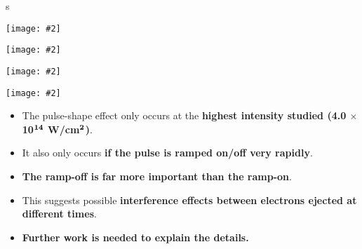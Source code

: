 \documentclass[landscape,a0b,final]{a0poster}
\newenvironment{poster}{
  \begin{center}
  \begin{minipage}[c]{0.98\textwidth}
}{
  \end{minipage} 
  \end{center}
}
\newcommand{\pbox}[4]{
\psshadowbox[#3]{
\begin{minipage}[t][#2][t]{#1}
#4
\end{minipage}
}}
\newcommand{\myfig}[3][0]{
\begin{center}
  \vspace{1.5cm}
  \texttt{[image: \#2]}
  \nobreak\medskip
\end{center}}
\newcommand{\mycaption}[1]{
  \vspace{0.5cm}
  \begin{quote}
    {{\sc Fig.} \arabic{figure}: #1}
  \end{quote}
  \vspace{1cm}
  \stepcounter{figure}
}
\begin{document}
\begin{poster}
\begin{multicols}{3}
  \vspace{-2.0cm}
  \setlength{\columnsep}{0pt}
  \setlength{\columnseprule}{0pt}
  \hspace{-2cm}s
  \begin{multicols}{2}
  \begin{center}
  \myfig{c_pulse_350_10_20_10.ps}{.90}
  \end{center}

  \begin{center}
  \myfig{c_fourier_350_10_20_10.ps}{.90}
  \end{center}
  \end{multicols}

  \vspace{-2.0cm}
  \setlength{\columnsep}{0pt}
  \setlength{\columnseprule}{0pt}
  \hspace{-2cm}
  \begin{multicols}{2}
  \begin{center}
  \myfig{c_pulse_350_20_0_20.ps}{.90}
  \end{center}

  \begin{center}
  \myfig{c_fourier_350_20_0_20.ps}{.90}
  \end{center}
  \end{multicols}


  \begin{center}\pbox{0.8\columnwidth}{}{linewidth=2mm,framearc=0.1,linecolor=lightblue,fillstyle=gradient,
             gradangle=0,gradbegin=whiteblue,gradend=whiteblue,gradmidpoint=1.0,framesep=1em}{\begin{center}{\Large\bf Conclusions}\end{center}}\end{center}\vspace{1cm}

\begin{itemize}
\item The pulse-shape effect only occurs at the {\bf\color{red} highest intensity studied (4.0 $\bm{\times}$ 10$^{\bf 14}$ W/cm$^{\bf 2}$)}.
\item It also only occurs {\bf\color{red} if the pulse is ramped on/off very rapidly}.
\item {\bf\color{red} The ramp-off is far more important than the ramp-on}.
\item This suggests possible {\bf\color{blue} interference effects between electrons ejected at different times}.
\item {\bf\color{newgreen} Further work is needed to explain the details.}
\end{itemize}



\end{multicols}
\end{poster}
\end{document}
